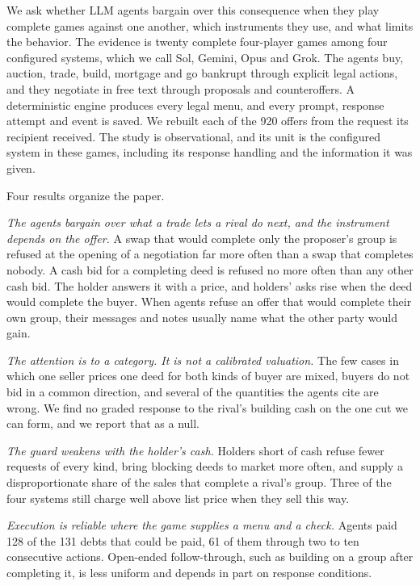 \documentclass[11pt,letterpaper]{article}
\begin{document}
We ask whether LLM agents bargain over this consequence when they play complete games against one another, which instruments they use, and what limits the behavior. The evidence is twenty complete four-player games among four configured systems, which we call Sol, Gemini, Opus and Grok. The agents buy, auction, trade, build, mortgage and go bankrupt through explicit legal actions, and they negotiate in free text through proposals and counteroffers. A deterministic engine produces every legal menu, and every prompt, response attempt and event is saved. We rebuilt each of the 920 offers from the request its recipient received. The study is observational, and its unit is the configured system in these games, including its response handling and the information it was given.

Four results organize the paper.

\emph{The agents bargain over what a trade lets a rival do next, and the instrument depends on the offer.} A swap that would complete only the proposer's group is refused at the opening of a negotiation far more often than a swap that completes nobody. A cash bid for a completing deed is refused no more often than any other cash bid. The holder answers it with a price, and holders' asks rise when the deed would complete the buyer. When agents refuse an offer that would complete their own group, their messages and notes usually name what the other party would gain.

\emph{The attention is to a category. It is not a calibrated valuation.} The few cases in which one seller prices one deed for both kinds of buyer are mixed, buyers do not bid in a common direction, and several of the quantities the agents cite are wrong. We find no graded response to the rival's building cash on the one cut we can form, and we report that as a null.

\emph{The guard weakens with the holder's cash.} Holders short of cash refuse fewer requests of every kind, bring blocking deeds to market more often, and supply a disproportionate share of the sales that complete a rival's group. Three of the four systems still charge well above list price when they sell this way.

\emph{Execution is reliable where the game supplies a menu and a check.} Agents paid 128 of the 131 debts that could be paid, 61 of them through two to ten consecutive actions. Open-ended follow-through, such as building on a group after completing it, is less uniform and depends in part on response conditions.
\end{document}
